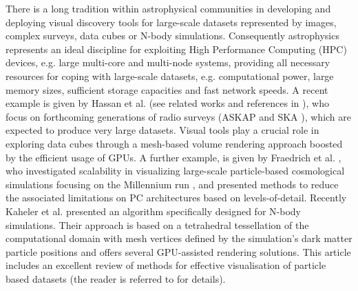 \documentclass[11pt]{article}
\begin{document}
There is a long tradition within astrophysical communities in developing and deploying visual discovery tools for large-scale datasets represented by images, complex surveys, data cubes or N-body simulations. Consequently astrophysics represents an ideal discipline for exploiting High Performance Computing (HPC) devices, e.g. large multi-core and multi-node systems, providing all necessary resources for coping with large-scale datasets, e.g. computational power, large memory sizes, sufficient storage capacities and fast network speeds. A recent example is given by Hassan et al. (see related works and references in \cite{2012ASPC..461...45H}), who focus on forthcoming generations of radio surveys (ASKAP and SKA \cite{}), which are expected to produce very large datasets. Visual tools play a crucial role in exploring data cubes through a mesh-based volume rendering approach boosted by the efficient usage of GPUs. A further example, is given by Fraedrich et al. \cite{Fraedrich:2009:TMV}, who
investigated scalability in visualizing large-scale particle-based cosmological 
simulations focusing on the Millennium run \cite{millennium}, and presented methods to reduce the associated limitations on PC architectures based on levels-of-detail.
Recently Kaheler et al. \cite{2012arXiv1208.3206K} presented an algorithm specifically designed for N-body simulations. Their approach is based on a tetrahedral tessellation of the computational domain with mesh vertices defined by the simulation's dark matter particle positions and offers several GPU-assisted rendering solutions. This article includes an excellent review of methods for effective visualisation of particle based datasets (the reader is referred to \cite{2012arXiv1208.3206K} for details).
\end{document}
